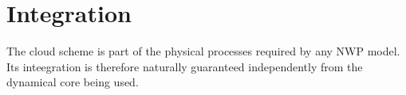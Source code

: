 \documentclass[
a4paper,     %
12pt,        %
article,
onecolumn,   %
openany,     %
]{memoir}
\begin{document}
 


\section{Integration}
The cloud scheme is part of the physical processes required by any NWP model.
Its inteegration is therefore naturally guaranteed independently from the 
dynamical core being used.


\backmatter




\end{document}
